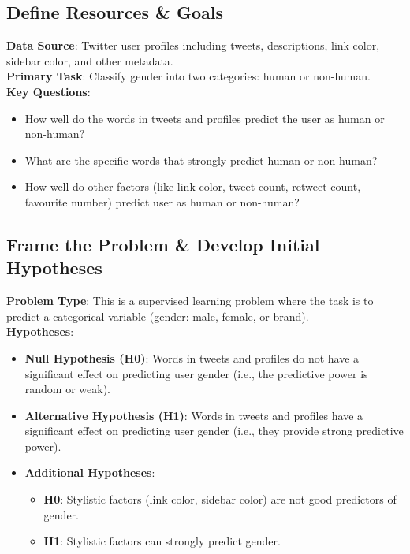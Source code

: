\documentclass[a4paper,11pt]{article}
\begin{document}
\subsection{Define Resources \& Goals}
\textbf{Data Source}: Twitter user profiles including tweets, descriptions, link color, sidebar color, and other metadata.\\
\textbf{Primary Task}: Classify gender into two categories: human or non-human.\\
\textbf{Key Questions}:
\begin{itemize}
    \item How well do the words in tweets and profiles predict the user as human or non-human?
    \item What are the specific words that strongly predict human or non-human?
    \item How well do other factors (like link color, tweet count, retweet count, favourite number) predict user as human or non-human?
\end{itemize}

\subsection{Frame the Problem \& Develop Initial Hypotheses}
\textbf{Problem Type}: This is a supervised learning problem where the task is to predict a categorical variable (gender: male, female, or brand).\\
\textbf{Hypotheses}:
\begin{itemize}
    \item \textbf{Null Hypothesis (H0)}: Words in tweets and profiles do not have a significant effect on predicting user gender (i.e., the predictive power is random or weak).
    \item \textbf{Alternative Hypothesis (H1)}: Words in tweets and profiles have a significant effect on predicting user gender (i.e., they provide strong predictive power).
    \item \textbf{Additional Hypotheses}:
    \begin{itemize}
        \item \textbf{H0}: Stylistic factors (link color, sidebar color) are not good predictors of gender.
        \item \textbf{H1}: Stylistic factors can strongly predict gender.
    \end{itemize}
\end{itemize}
\end{document}
